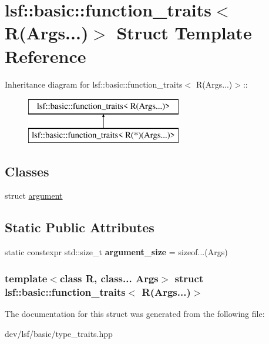 \hypertarget{structlsf_1_1basic_1_1function__traits_3_01R_07Args_8_8_8_08_4}{
\section{lsf::basic::function\_\-traits$<$ R(Args...)$>$ Struct Template Reference}
\label{structlsf_1_1basic_1_1function__traits_3_01R_07Args_8_8_8_08_4}
}
Inheritance diagram for lsf::basic::function\_\-traits$<$ R(Args...)$>$::\begin{figure}[H]
\begin{center}
\leavevmode
\includegraphics[height=2cm]{structlsf_1_1basic_1_1function__traits_3_01R_07Args_8_8_8_08_4}
\end{center}
\end{figure}
\subsection*{Classes}
\begin{DoxyCompactItemize}
\item 
struct \hyperlink{structlsf_1_1basic_1_1function__traits_3_01R_07Args_8_8_8_08_4_1_1argument}{argument}
\end{DoxyCompactItemize}
\subsection*{Static Public Attributes}
\begin{DoxyCompactItemize}
\item 
\hypertarget{structlsf_1_1basic_1_1function__traits_3_01R_07Args_8_8_8_08_4_a3025bfe317abbbb2a4db0d4d26b2f028}{
static constexpr std::size\_\-t {\bfseries argument\_\-size} = sizeof...(Args)}
\label{structlsf_1_1basic_1_1function__traits_3_01R_07Args_8_8_8_08_4_a3025bfe317abbbb2a4db0d4d26b2f028}

\end{DoxyCompactItemize}
\subsubsection*{template$<$class R, class... Args$>$ struct lsf::basic::function\_\-traits$<$ R(Args...)$>$}



The documentation for this struct was generated from the following file:\begin{DoxyCompactItemize}
\item 
dev/lsf/basic/type\_\-traits.hpp\end{DoxyCompactItemize}
